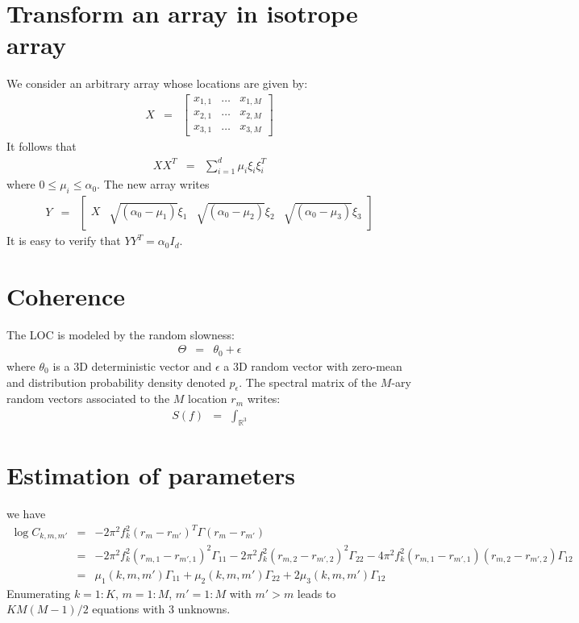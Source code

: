 \documentclass[a4paper, 12pt]{report}
\begin{document}
\appendix
\chapter{Transform an array in isotrope array}
We consider an arbitrary  array whose locations are given by:
\begin{eqnarray*}
X&=&\begin{bmatrix}
x_{1,1}&\ldots&x_{1,M}
\\
x_{2,1}&\ldots&x_{2,M}
\\
x_{3,1}&\ldots&x_{3,M}
\end{bmatrix}
\end{eqnarray*}
It follows that
\begin{eqnarray*}
 XX^{T}&=&
 \sum_{i=1}^{d}\mu_{i}\xi_{i}\xi^{T}_{i}
\end{eqnarray*}
where $0\leq \mu_{i}\leq \alpha_{0}$. The new array writes
\begin{eqnarray*}
Y &=& \begin{bmatrix}
X&\sqrt{(\alpha_{0}-\mu_{1})}\xi_{1}&\sqrt{(\alpha_{0}-\mu_{2})}\xi_{2}&\sqrt{(\alpha_{0}-\mu_{3})}\xi_{3}
\end{bmatrix}
\end{eqnarray*}
It is easy to verify that $YY^{T}=\alpha_{0}I_{d}$.

\chapter{Coherence}
The LOC is modeled by the random slowness:
\begin{eqnarray*}
\Theta &=& \theta_0+\epsilon
\end{eqnarray*}
where $\theta_0$ is a 3D deterministic vector and $\epsilon$ a 3D random vector with zero-mean and distribution probability density denoted $p_{\epsilon}$. The spectral matrix of the $M$-ary random vectors associated to the $M$ location $r_{m}$ writes:
\begin{eqnarray*}
S(f) &=& \int_{\mathds{R}^3}
\end{eqnarray*}
\chapter{Estimation of parameters}

we have 
\begin{eqnarray*}
 \log C_{k,m,m'} &=&-2\pi^{2} f_{k}^{2}(r_{m}-r_{m'})^{T}\Gamma(r_{m}-r_{m'})
 \\
 &=&
-2\pi^{2} f_{k}^{2}(r_{m,1}-r_{m',1})^{2}\Gamma_{11}
-2\pi^{2} f_{k}^{2}(r_{m,2}-r_{m',2})^{2}\Gamma_{22}
-4\pi^{2} f_{k}^{2}(r_{m,1}-r_{m',1})(r_{m,2}-r_{m',2})\Gamma_{12}
\\
&=&
\mu_{1}(k,m,m')\Gamma_{11}
+\mu_{2}(k,m,m')\Gamma_{22}
+2\mu_{3}(k,m,m')\Gamma_{12}
\end{eqnarray*}
Enumerating $k=1:K$, $m=1:M$, $m'=1:M$ with $m'>m$ leads to $KM(M-1)/2$ equations with 3 unknowns.
\end{document}
